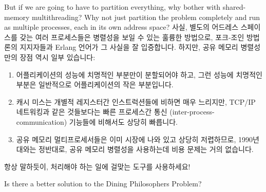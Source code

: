 \begin{enumerate}
	But if we are going to have to partition everything, why bother
	with shared-memory multithreading?
	Why not just partition the problem completely and run as
	multiple processes, each in its own address space?
	\fi
\QuickA{}
	사실, 별도의 어드레스 스페이스를 갖는 여러 프로세스들은 병렬성을 보일
	수 있는 훌륭한 방법으로, 포크-조인 방법론의 지지자들과 Erlang 언어가 그
	사실을 잘 입증합니다.
	하지만, 공유 메모리 병렬성만의 장점 역시 일부 있습니다:
	\begin{enumerate}
	\item	어플리케이션의 성능에 치명적인 부분만이 분할되어야 하고, 그런
		성능에 치명적인 부분은 일반적으로 어플리케이션의 작은
		부분입니다.
	\item	캐시 미스는 개별적 레지스터간 인스트럭션들에 비하면 매우
		느리지만, TCP/IP 네트워킹과 같은 것들보다는 빠른 프로세스간
		통신 (inter-process-communication) 기능들에 비해서도 상당히
		빠릅니다.
	\item	공유 메모리 멀티프로세서들은 이미 시장에 나와 있고 상당히
		저렵하므로, 1990년대와는 정반대로, 공유 메모리 병렬성을
		사용하는데 비용 문제는 거의 없습니다.
	\end{enumerate}
	항상 말하듯이, 처리해야 하는 일에 걸맞는 도구를 사용하세요!

\QuickQ{}
	Is there a better solution to the Dining
	Philosophers Problem?
\QuickA{}


\end{enumerate}
